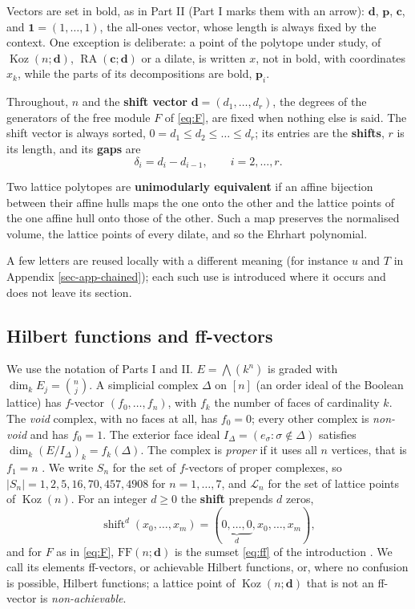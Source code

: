\documentclass[11pt, a4paper, abstract=yes]{scrartcl}
\theoremstyle{definition}
\theoremstyle{remark}
\theoremstyle{plain}
\newcommand{\vek}[1]{\boldsymbol{#1}}
\theoremstyle{remark}
\theoremstyle{plain}
\newcommand{\Koz}{\operatorname{Koz}}
\newcommand{\shift}{\operatorname{shift}}
\newcommand{\RA}{\operatorname{RA}}
\newcommand{\FF}{\mathrm{FF}}
\begin{document}
Vectors are set in bold, as in Part II \autocite{SnellmanArticle2} (Part I marks them with an arrow):
\(\vek d\), \(\vek p\), \(\vek c\), and \(\vek 1=(1,\dots,1)\), the all-ones vector, whose length is
always fixed by the context. One exception is deliberate: a point of the polytope under study, of
\(\Koz(n;\vek d)\), \(\RA(\vek c;\vek d)\) or a dilate, is written \(x\), not in bold, with
coordinates \(x_k\), while the parts of its decompositions are bold, \(\vek p_i\).

Throughout, \(n\) and the \textbf{shift vector} \(\vek d=(d_1,\dots,d_r)\), the degrees of the generators of
the free module \(F\) of \eqref{eq:F}, are fixed when nothing else is said. The shift vector is always sorted,
\(0=d_1\le d_2\le\dots\le d_r\); its entries are the \textbf{shifts}, \(r\) is its length, and its \textbf{gaps}
are
\begin{equation}\label{eq:gaps}
  \delta_i=d_i-d_{i-1},\qquad i=2,\dots,r .
\end{equation}

Two lattice polytopes are \textbf{unimodularly equivalent} if an affine bijection between their affine hulls
maps the one onto the other and the lattice points of the one affine hull onto those of the other.
Such a map preserves the normalised volume, the lattice points of every dilate, and so the Ehrhart
polynomial.

A few letters are reused locally with a different meaning (for instance \(u\) and \(T\) in
Appendix \ref{sec-app-chained}); each such use is introduced where it occurs and does not leave its
section.
\subsection{Hilbert functions and ff-vectors}
\label{sec:orgc7d803a}

We use the notation of Parts I and II. \(E=\bigwedge(k^n)\) is graded with
\(\dim_kE_j=\binom nj\). A simplicial complex \(\Delta\) on \([n]\) (an order ideal of the Boolean
lattice) has \(f\)-vector \((f_0,\dots,f_n)\), with \(f_k\) the number of faces of cardinality
\(k\). The \emph{void} complex, with no faces at all, has \(f_0=0\); every other complex is \emph{non-void}
and has \(f_0=1\). The exterior face ideal
\(I_\Delta=(e_\sigma:\sigma\notin\Delta)\) satisfies \(\dim_k(E/I_\Delta)_k=f_k(\Delta)\). The
complex is \emph{proper} if it uses all \(n\) vertices, that is \(f_1=n\)
\autocite[Definition 10]{SnellmanArticle1}. We write \(S_n\) for the set of \(f\)-vectors of proper
complexes, so \(\lvert S_n\rvert=1,2,5,16,70,457,4908\) for \(n=1,\dots,7\), and \(\mathcal L_n\)
for the set of lattice points of \(\Koz(n)\). For an integer \(d\ge0\) the \textbf{shift} prepends \(d\)
zeros,
\begin{equation}\label{eq:shift}
  \shift^d(x_0,\dots,x_m)=(\underbrace{0,\dots,0}_{d},x_0,\dots,x_m),
\end{equation}
and for \(F\) as in \eqref{eq:F}, \(\FF(n;\vek d)\) is the sumset \eqref{eq:ff} of the introduction
\autocite[Proposition 35]{SnellmanArticle1}. We call its elements ff-vectors, or achievable Hilbert
functions, or, where no confusion is possible, Hilbert functions; a lattice point of
\(\Koz(n;\vek d)\) that is not an ff-vector is \emph{non-achievable}.
\end{document}
